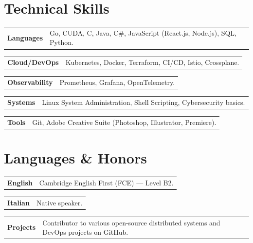 \documentclass[11pt,a4paper]{article}
\makeatletter
\newcommand{\cvitem}[2]{
    \noindent
    \begin{tabularx}{\textwidth}{@{}p{3.5cm} X@{}}
        \textbf{#1} & #2
    \end{tabularx}
    \vspace{4pt}
}
\makeatother
\begin{document}
\section{Technical Skills}
\cvitem{Languages}{Go, CUDA, C, Java, C\#, JavaScript (React.js, Node.js), SQL, Python.}
\cvitem{Cloud/DevOps}{Kubernetes, Docker, Terraform, CI/CD, Istio, Crossplane.}
\cvitem{Observability}{Prometheus, Grafana, OpenTelemetry.}
\cvitem{Systems}{Linux System Administration, Shell Scripting, Cybersecurity basics.}
\cvitem{Tools}{Git, Adobe Creative Suite (Photoshop, Illustrator, Premiere).}

\section{Languages \& Honors}
\cvitem{English}{Cambridge English First (FCE) --- Level B2.}
\cvitem{Italian}{Native speaker.}
\cvitem{Projects}{Contributor to various open-source distributed systems and DevOps projects on GitHub.}
\end{document}
